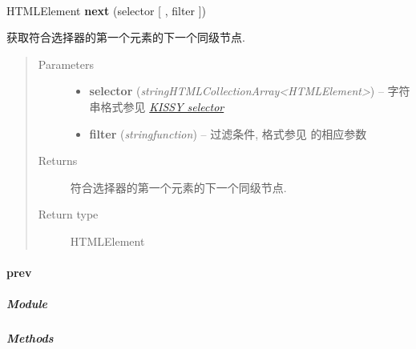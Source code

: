 \documentclass[letterpaper,10pt,english]{sphinxmanual}
\begin{document}
\begin{fulllineitems}
\label{api/core/dom/next:DOM.next}~
\begin{DUlineblock}{0em}
\item[] HTMLElement \textbf{next} (selector {[} , filter {]})
\item[] 获取符合选择器的第一个元素的下一个同级节点.
\end{DUlineblock}
\begin{quote}\begin{description}
\item[{Parameters}] \leavevmode\begin{itemize}
\item {}
\textbf{selector} (\emph{string\textbar{}HTMLCollection\textbar{}Array\textless{}HTMLElement\textgreater{}}) -- 字符串格式参见 {\hyperref[api/core/dom/selector:dom-selector]{\emph{KISSY selector}}}

\item {}
\textbf{filter} (\emph{string\textbar{}function}) -- 过滤条件, 格式参见 {\hyperref[api/core/dom/filter:DOM.filter]{}} 的相应参数

\end{itemize}

\item[{Returns}] \leavevmode
符合选择器的第一个元素的下一个同级节点.

\item[{Return type}] \leavevmode
HTMLElement

\end{description}\end{quote}

\end{fulllineitems}



\paragraph{prev}
\label{api/core/dom/prev:prev}\label{api/core/dom/prev::doc}

\subparagraph{Module}
\label{api/core/dom/prev:module}\begin{quote}

{\hyperref[api/core/dom/index:module-DOM]{}}
\end{quote}


\subparagraph{Methods}
\label{api/core/dom/prev:methods}
\end{document}
